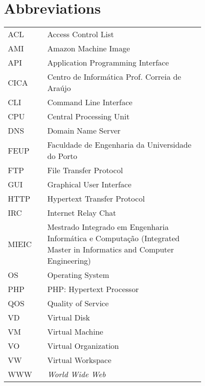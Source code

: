 \chapter*{Abbreviations}\label{chap:abbrev}

\begin{flushleft}
\begin{tabular}{l p{0.8\linewidth}}
ACL	 & Access Control List\\
AMI	 & Amazon Machine Image\\
API	 & Application Programming Interface\\
CICA	 & Centro de Informática Prof. Correia de Araújo\\
CLI	 & Command Line Interface\\
CPU	 & Central Processing Unit\\
DNS	 & Domain Name Server\\
FEUP	 & Faculdade de Engenharia da Universidade do Porto\\
FTP	 & File Transfer Protocol\\
GUI	 & Graphical User Interface\\
HTTP	 & Hypertext Transfer Protocol\\
IRC	 & Internet Relay Chat\\
MIEIC	 & Mestrado Integrado em Engenharia Informática e Computação (Integrated Master in Informatics and Computer Engineering)\\
OS	 & Operating System\\
PHP	 & PHP: Hypertext Processor\\
QOS	 & Quality of Service\\
VD	 & Virtual Disk\\
VM	 & Virtual Machine\\
VO	 & Virtual Organization\\
VW	 & Virtual Workspace\\
WWW      & \emph{World Wide Web}
\end{tabular}
\end{flushleft}

